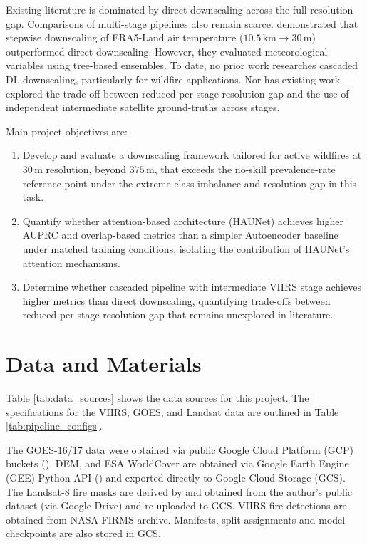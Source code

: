 \documentclass[a4paper, 11pt]{article} %
\begin{document}
Existing literature is dominated by direct downscaling across the full resolution gap. Comparisons of multi-stage pipelines also remain scarce. \cite{liStepwiseDownscalingERA5Land2025} demonstrated that stepwise downscaling of ERA5-Land air temperature ($10.5\,\text{km} \rightarrow 30\,\text{m}$) outperformed direct downscaling. However, they evaluated meteorological variables using tree-based ensembles. To date, no prior work researches cascaded DL downscaling, particularly for wildfire applications. Nor has existing work explored the trade-off between reduced per-stage resolution gap and the use of independent intermediate satellite ground-truths across stages.

Main project objectives are:
\begin{enumerate}
    \item Develop and evaluate a downscaling framework tailored for active wildfires at $30\,\text{m}$ resolution, beyond $375\,\text{m}$, that exceeds the no-skill prevalence-rate reference-point under the extreme class imbalance and resolution gap in this task.
    \item Quantify whether attention-based architecture (HAUNet) achieves higher AUPRC and overlap-based metrics than a simpler Autoencoder baseline under matched training conditions, isolating the contribution of HAUNet's attention mechanisms.
    \item Determine whether cascaded pipeline with intermediate VIIRS stage achieves higher metrics than direct downscaling, quantifying trade-offs between reduced per-stage resolution gap that remains unexplored in literature.
\end{enumerate}

\section{Data and Materials}\label{sec:data}
Table \ref{tab:data_sources} shows the data sources for this project. The specifications for the VIIRS, GOES, and Landsat data are outlined in Table \ref{tab:pipeline_configs}.

The GOES-16/17 data were obtained via public Google Cloud Platform (GCP) buckets (\cite{noaa_goes16_gcp, noaa_goes17_gcp}). DEM, and ESA WorldCover are obtained via Google Earth Engine (GEE) Python API (\cite{gorelickGoogleEarthEngine2017}) and exported directly to Google Cloud Storage (GCS). The Landsat-8 fire masks are derived by \cite{dealmeidapereiraActiveFireDetection2021} and obtained from the author's public dataset (via Google Drive) and re-uploaded to GCS. VIIRS fire detections are obtained from NASA FIRMS archive. Manifests, split assignments and model checkpoints are also stored in GCS. 
\end{document}
